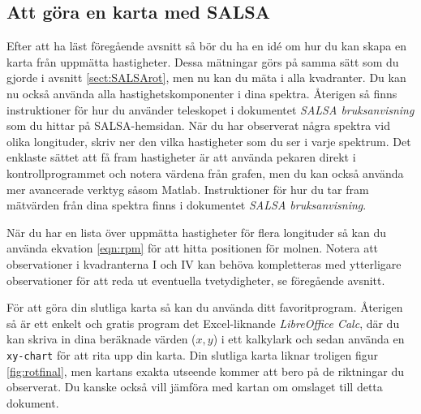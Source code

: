 \subsection{Att göra en karta med SALSA}
\label{sect:SALSAmap}
Efter att ha läst föregående avsnitt så bör du ha en idé om hur du kan skapa
en karta från uppmätta hastigheter. Dessa mätningar görs på samma sätt 
som du gjorde i avsnitt \ref{sect:SALSArot}, men nu kan du mäta i alla kvadranter. 
Du kan nu också använda alla hastighetskomponenter i dina spektra.
Återigen så finns instruktioner för hur du använder teleskopet i dokumentet
\emph{SALSA bruksanvisning} som du hittar på SALSA-hemsidan.  När du har
observerat några spektra vid olika longituder, skriv ner den vilka hastigheter
som du ser i varje spektrum.
Det enklaste sättet att få fram hastigheter är att använda pekaren direkt i
kontrollprogrammet och notera värdena från grafen, men du kan också använda mer
avancerade verktyg såsom Matlab. Instruktioner för hur du tar fram mätvärden
från dina spektra finns i dokumentet \emph{SALSA bruksanvisning}.

När du har en lista över uppmätta hastigheter för flera longituder så kan du 
använda ekvation \ref{eqn:rpm} för att hitta positionen för molnen. Notera 
att observationer i kvadranterna I och IV kan behöva kompletteras med ytterligare
observationer för att reda ut eventuella tvetydigheter, se föregående avsnitt. 

För att göra din slutliga karta så kan du använda ditt favoritprogram. Återigen
så är ett enkelt och gratis program det Excel-liknande \emph{LibreOffice Calc},
där du kan skriva in dina beräknade värden ($x, y$) i ett kalkylark och sedan
använda en {\tt xy-chart} för att rita upp din karta. Din slutliga karta liknar
troligen figur \ref{fig:rotfinal}, men kartans exakta utseende kommer att bero
på de riktningar du observerat. Du kanske också vill jämföra med kartan om
omslaget till detta dokument. 

